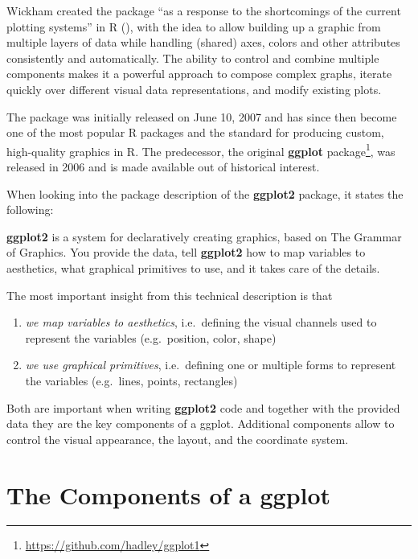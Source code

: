 \documentclass[
]{krantz}
\providecommand{\tightlist}{%
  \setlength{\itemsep}{0pt}\setlength{\parskip}{0pt}}
\renewenvironment{quote}{\begin{VF}}{\end{VF}}
\renewcommand{\href}[2]{#2\footnote{\url{#1}}}
\begin{document}
Wickham created the package ``as a response to the shortcomings of the current plotting systems'' in R (\citet{wickham2006}), with the idea to allow building up a graphic from multiple layers of data while handling (shared) axes, colors and other attributes consistently and automatically. The ability to control and combine multiple components makes it a powerful approach to compose complex graphs, iterate quickly over different visual data representations, and modify existing plots.

The package was initially released on June 10, 2007 and has since then become one of the most popular R packages and the standard for producing custom, high-quality graphics in R. The predecessor, the original \href{https://github.com/hadley/ggplot1}{\textbf{ggplot} package}, was released in 2006 and is made available out of historical interest.

When looking into the package description of the \textbf{ggplot2} package, it states the following:

\begin{quote}
\textbf{ggplot2} is a system for declaratively creating graphics, based on The Grammar of Graphics. You provide the data, tell \textbf{ggplot2} how to map variables to aesthetics, what graphical primitives to use, and it takes care of the details.
\end{quote}

The most important insight from this technical description is that

\begin{enumerate}
\def\labelenumi{\arabic{enumi}.}
\tightlist
\item
  \emph{we map variables to aesthetics}, i.e.~defining the visual channels used to represent the variables (e.g.~position, color, shape)
\item
  \emph{we use graphical primitives}, i.e.~defining one or multiple forms to represent the variables (e.g.~lines, points, rectangles)
\end{enumerate}

Both are important when writing \textbf{ggplot2} code and together with the provided data they are the key components of a ggplot. Additional components allow to control the visual appearance, the layout, and the coordinate system.

\hypertarget{components}{%
\section{The Components of a ggplot}\label{components}}
\end{document}
